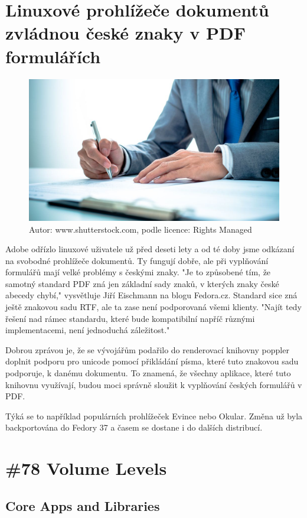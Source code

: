 \documentclass[a4paper,12pt]{report}
\begin{document}
\chapter{Linuxové prohlížeče dokumentů zvládnou české znaky v PDF formulářích}
\begin{figure}[htp]
\centering
\includegraphics[width=16cm]{IKT_18_1_23@3.jpg}
\caption[ ]{Autor: www.shutterstock.com, podle licence: Rights Managed}
\end{figure}
Adobe odřízlo linuxové uživatele už před deseti lety a od té doby jsme odkázaní na svobodné prohlížeče dokumentů. Ty fungují dobře, ale při vyplňování formulářů mají velké problémy s českými znaky. "Je to způsobené tím, že samotný standard PDF zná jen základní sady znaků, v kterých znaky české abecedy chybí," vysvětluje Jiří Eischmann na blogu Fedora.cz. Standard sice zná ještě znakovou sadu RTF, ale ta zase není podporovaná všemi klienty. "Najít tedy řešení nad rámec standardu, které bude kompatibilní napříč různými implementacemi, není jednoduchá záležitost."

Dobrou zprávou je, že se vývojářům podařilo do renderovací knihovny poppler doplnit podporu pro unicode pomocí přikládání písma, které tuto znakovou sadu podporuje, k danému dokumentu. To znamená, že všechny aplikace, které tuto knihovnu využívají, budou moci správně sloužit k vyplňování českých formulářů v PDF.

Týká se to například populárních prohlížeček Evince nebo Okular. Změna už byla backportována do Fedory 37 a časem se dostane i do dalších distribucí.
\newpage
\chapter[Volume Levels]{\#78 Volume Levels}
\section{Core Apps and Libraries}
\end{document}
